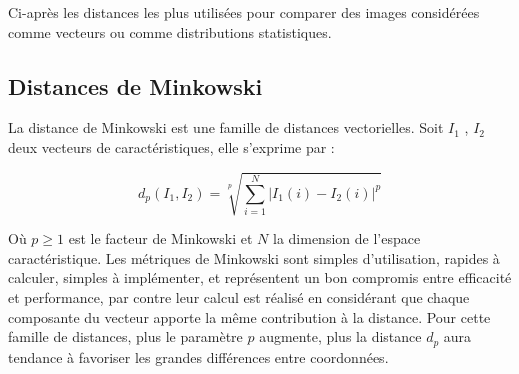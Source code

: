 Ci-après les distances les plus utilisées pour comparer des images considérées comme
vecteurs ou comme distributions statistiques. 
\subsection{Distances de Minkowski}
La distance de Minkowski est une famille de distances vectorielles. Soit $I_1$ , $I_2$ deux vecteurs de caractéristiques, elle s'exprime par :

\begin{equation}
        d_p(I_1, I_2) =  \sqrt[p]{\sum_{i=1}^{N} \left|{I}_{1}(i)-{I}_{2}(i)\right|^p} 
\end{equation}

Où $p\geq 1$ est le facteur de Minkowski et $N$ la dimension de l’espace caractéristique. Les métriques de Minkowski sont simples d’utilisation, rapides à calculer, simples à implémenter, et représentent un bon compromis entre efficacité et performance, par contre leur calcul est réalisé en considérant que chaque composante du vecteur apporte la même contribution à la distance. Pour cette famille de distances, plus le paramètre $p$ augmente, plus la distance $d_p$ aura tendance à favoriser les grandes différences entre coordonnées.

